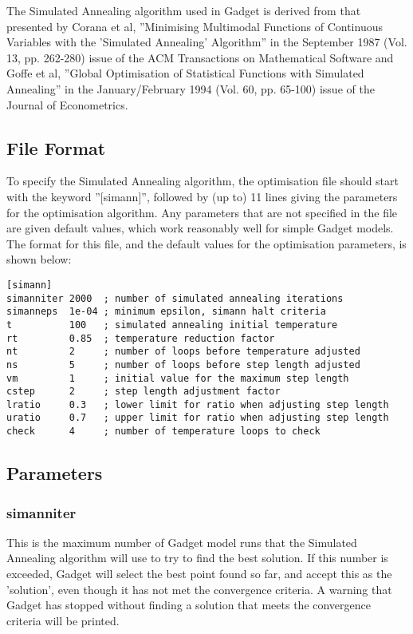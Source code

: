 \documentclass [a4paper, 10pt]{book}
\begin{document}
\bigskip
The Simulated Annealing algorithm used in Gadget is derived from that presented by Corana et al, ''Minimising Multimodal Functions of Continuous Variables with the 'Simulated Annealing' Algorithm'' in the September 1987 (Vol. 13, pp. 262-280) issue of the ACM Transactions on Mathematical Software and Goffe et al, ''Global Optimisation of Statistical Functions with Simulated Annealing'' in the January/February 1994 (Vol. 60, pp. 65-100) issue of the Journal of Econometrics.

\subsection{File Format}\label{subsec:simannfile}
To specify the Simulated Annealing algorithm, the optimisation file should start with the keyword ''[simann]'', followed by (up to) 11 lines giving the parameters for the optimisation algorithm.  Any parameters that are not specified in the file are given default values, which work reasonably well for simple Gadget models.  The format for this file, and the default values for the optimisation parameters, is shown below:

{\small\begin{verbatim}
[simann]
simanniter 2000  ; number of simulated annealing iterations
simanneps  1e-04 ; minimum epsilon, simann halt criteria
t          100   ; simulated annealing initial temperature
rt         0.85  ; temperature reduction factor
nt         2     ; number of loops before temperature adjusted
ns         5     ; number of loops before step length adjusted
vm         1     ; initial value for the maximum step length
cstep      2     ; step length adjustment factor
lratio     0.3   ; lower limit for ratio when adjusting step length
uratio     0.7   ; upper limit for ratio when adjusting step length
check      4     ; number of temperature loops to check
\end{verbatim}}

\subsection{Parameters}\label{subsec:simannpar}
\subsubsection{simanniter}
This is the maximum number of Gadget model runs that the Simulated Annealing algorithm will use to try to find the best solution.  If this number is exceeded, Gadget will select the best point found so far, and accept this as the 'solution', even though it has not met the convergence criteria.  A warning that Gadget has stopped without finding a solution that meets the convergence criteria will be printed.
\end{document}
